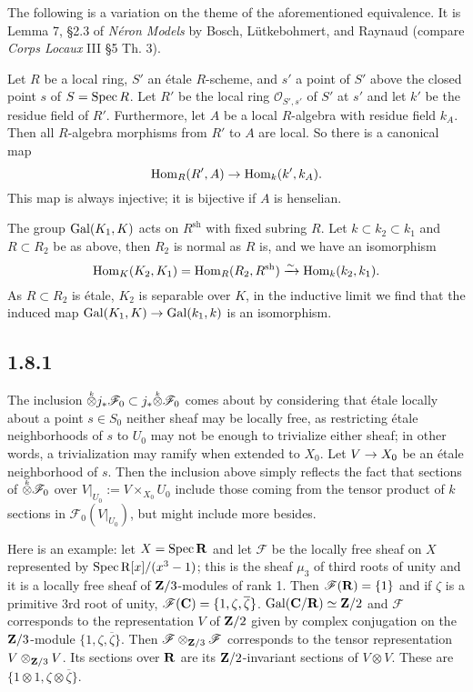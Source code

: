 \documentclass[deligne.tex]{subfiles}
\begin{document}
	The following is a variation on the theme of the aforementioned 
	equivalence. It is Lemma 7, \S2.3 of \emph{Néron Models}
	by Bosch, Lütkebohmert, and Raynaud
	(compare \emph{Corps Locaux} III \S5 Th. 3).
	\begin{lemma*}
 		Let $R$ be a local ring, $S'$ an étale $R$-scheme, and $s'$ a point
 		of $S'$ above the closed point $s$ of $S=\operatorname{Spec} R$. Let $R'$ be the
 		local ring $\mathscr O_{S',s'}$ of $S'$ at $s'$ and let $k'$ be
 		the residue field of $R'$. Furthermore, let $A$ be a local
 		$R$-algebra with residue field $k_A$. Then all $R$-algebra morphisms
 		from $R'$ to $A$ are local. So there is a canonical map
 		\begin{equation*}
 			\operatorname{Hom}_R(R',A)\rightarrow\operatorname{Hom}_k(k',k_A).
 		\end{equation*}
		This map is always injective; it is bijective if $A$ is henselian.
 	\end{lemma*}
 	The group $\operatorname{Gal}(K_1,K)$ acts on $R^{\text{sh}}$ with fixed
 	subring $R$. Let $k\subset k_2\subset k_1$ and $R\subset R_2$ be as
 	above, then $R_2$ is normal as $R$ is, and we have an isomorphism
 	\begin{equation*}
 		\operatorname{Hom}_K(K_2,K_1)=\operatorname{Hom}_R(R_2,R^{\text{sh}})\xrightarrow{\sim}\operatorname{Hom}_k(k_2,k_1).
 	\end{equation*}
As $R\subset R_2$ is étale, $K_2$ is separable over $K$, in the inductive
limit we find that the induced map $\operatorname{Gal}(K_1,K)\rightarrow\operatorname{Gal}(k_1,k)$ is an 
isomorphism.

\subsection*{1.8.1} The inclusion
$\accentset{k}{\otimes} j_\ast\mathscr F_0\subset j_\ast\accentset{k}{\otimes}\mathscr F_0$
comes about by considering that étale locally about a point $s\in S_0$ 
neither sheaf may be locally free, as restricting étale neighborhoods of
$s$ to $U_0$ may not be enough to trivialize either sheaf; in other words,
a trivialization may ramify when extended to $X_0$. Let $V\rightarrow X_0$ be an
étale neighborhood of $s$. Then the inclusion above simply reflects the fact 
that sections of $\accentset{k}{\otimes}\mathscr F_0$ over
$V|_{U_0}:=V\times_{X_0}U_0$ include those coming from the tensor product of
$k$ sections in $\mathscr F_0(V|_{U_0})$, but might include more besides.

Here is an example: let $X=\operatorname{Spec}\mathbf{R}$ and let $\mathscr F$ be the locally 
free sheaf on $X$ represented by $\operatorname{Spec}\operatorname{R}[x]/(x^3-1)$; this is the sheaf
$\mu_3$ of third roots of unity and it is a locally free sheaf of
$\mathbf{Z}/3$-modules of rank 1.
Then $\mathscr F(\mathbf{R})=\{1\}$ and if $\zeta$ is a primitive 3rd root of 
unity, $\mathscr F(\mathbf{C})=\{1,\zeta,\overline\zeta\}$.
$\operatorname{Gal}(\mathbf{C}/\mathbf{R})\simeq\mathbf{Z}/2$ and $\mathscr F$ corresponds to the 
representation $V$ of $\mathbf{Z}/2$ given by complex conjugation on the
$\mathbf{Z}/3$-module $\{1,\zeta,\overline\zeta\}$.
Then $\mathscr F\otimes_{\mathbf{Z}/3}\mathscr F$
corresponds to the tensor representation $V\otimes_{\mathbf{Z}/3} V$.
Its sections over $\mathbf{R}$ are its $\mathbf{Z}/2$-invariant sections of
$V\otimes V$. These are $\{1\otimes 1,\zeta\otimes\overline\zeta\}$.
\end{document}
